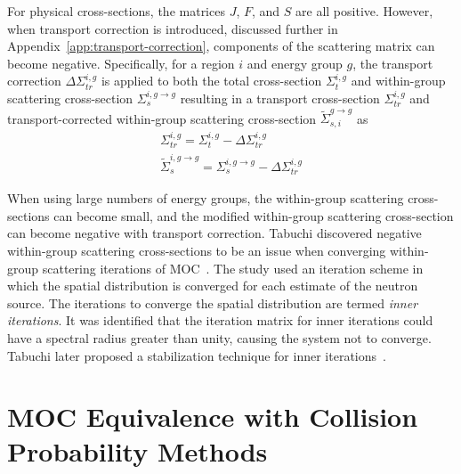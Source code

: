 For physical cross-sections, the matrices $J$, $F$, and $S$ are all positive. However, when transport correction is introduced, discussed further in Appendix~\ref{app:transport-correction}, components of the scattering matrix can become negative. Specifically, for a region $i$ and energy group $g$, the transport correction $\Delta \Sigma_{\textit{tr}}^{i, g}$ is applied to both the total cross-section $\Sigma_{t}^{i, g}$ and within-group scattering cross-section $\Sigma_{s}^{i, g \rightarrow g}$ resulting in a transport cross-section $\Sigma_{\textit{tr}}^{i, g}$ and transport-corrected within-group scattering cross-section $\tilde{\Sigma}_{s, i}^{g \rightarrow g}$ as
\begin{equation}
\begin{split}
\Sigma_{\textit{tr}}^{i,g} = \Sigma_{t}^{i,g} -  \Delta \Sigma_{\textit{tr}}^{i, g} \\
\tilde{\Sigma}_{s}^{i,g \rightarrow g} = \Sigma_{s}^{i, g \rightarrow g} -  \Delta \Sigma_{\textit{tr}}^{i, g}
\end{split}
\label{eq:total-xs}
\end{equation}

When using large numbers of energy groups, the within-group scattering cross-sections can become small, and the modified within-group scattering cross-section can become negative with transport correction. Tabuchi discovered negative within-group scattering cross-sections to be an issue when converging within-group scattering iterations of \ac{MOC}~\cite{ty-problem}. The study used an iteration scheme in which the spatial distribution is converged for each estimate of the neutron source. The iterations to converge the spatial distribution are termed \textit{inner iterations}. It was identified that the iteration matrix for inner iterations could have a spectral radius greater than unity, causing the system not to converge. Tabuchi later proposed a stabilization technique for inner iterations~\cite{ty-solution}.


\section{MOC Equivalence with Collision Probability Methods}
\label{sec:equiv-cpm}

